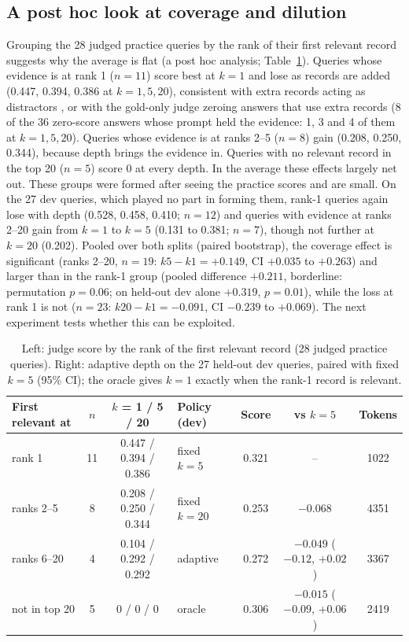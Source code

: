 \documentclass{article}
\begin{document}
\subsection{A post hoc look at coverage and dilution}
\label{sec:mechanism}

Grouping the 28 judged practice queries by the rank of their first relevant record suggests why the average is flat (a post hoc analysis; Table~\ref{tab:mech}). Queries whose evidence is at rank 1 ($n=11$) score best at $k=1$ and lose as records are added (0.447, 0.394, 0.386 at $k=1,5,20$), consistent with extra records acting as distractors \citep{liu2024lost}, or with the gold-only judge zeroing answers that use extra records (8 of the 36 zero-score answers whose prompt held the evidence: 1, 3 and 4 of them at $k=1,5,20$). Queries whose evidence is at ranks 2--5 ($n=8$) gain (0.208, 0.250, 0.344), because depth brings the evidence in. Queries with no relevant record in the top 20 ($n=5$) score 0 at every depth. In the average these effects largely net out. These groups were formed after seeing the practice scores and are small. On the 27 dev queries, which played no part in forming them, rank-1 queries again lose with depth (0.528, 0.458, 0.410; $n=12$) and queries with evidence at ranks 2--20 gain from $k=1$ to $k=5$ (0.131 to 0.381; $n=7$), though not further at $k=20$ (0.202). Pooled over both splits (paired bootstrap), the coverage effect is significant (ranks 2--20, $n=19$: $k5-k1=+0.149$, CI $+0.035$ to $+0.263$) and larger than in the rank-1 group (pooled difference $+0.211$, borderline: permutation $p=0.06$; on held-out dev alone $+0.319$, $p=0.01$), while the loss at rank 1 is not ($n=23$: $k20-k1=-0.091$, CI $-0.239$ to $+0.069$). The next experiment tests whether this can be exploited.

\begin{table}[t]
\caption{Left: judge score by the rank of the first relevant record (28 judged practice queries). Right: adaptive depth on the 27 held-out dev queries, paired with fixed $k=5$ (95\% CI); the oracle gives $k=1$ exactly when the rank-1 record is relevant.}
\label{tab:mech}
\begin{center}
\footnotesize
\setlength{\tabcolsep}{4pt}
\begin{tabular}{lcc@{\hspace{1.5em}}lccc}
\toprule
First relevant at & $n$ & $k$ = 1 / 5 / 20 & Policy (dev) & Score & vs $k=5$ & Tokens \\
\midrule
rank 1 & 11 & 0.447 / 0.394 / 0.386 & fixed $k=5$ & 0.321 & -- & 1022 \\
ranks 2--5 & 8 & 0.208 / 0.250 / 0.344 & fixed $k=20$ & 0.253 & $-0.068$ & 4351 \\
ranks 6--20 & 4 & 0.104 / 0.292 / 0.292 & adaptive & 0.272 & $-0.049$ ($-0.12$, $+0.02$) & 3367 \\
not in top 20 & 5 & 0 / 0 / 0 & oracle & 0.306 & $-0.015$ ($-0.09$, $+0.06$) & 2419 \\
\bottomrule
\end{tabular}
\end{center}
\end{table}
\end{document}
